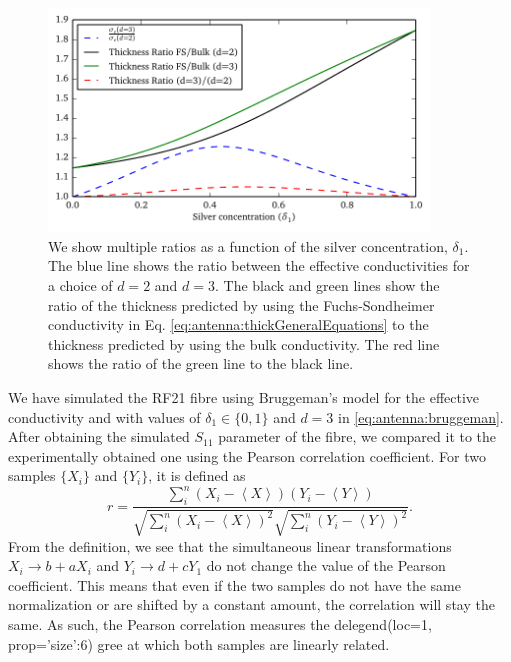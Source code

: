 \begin{figure}
  \centering
  \includegraphics[width=0.9\textwidth]{figs/active/comparisonThickness.pdf}
  \caption[Thickness ratios as a function of the silver concentration]
	  {We show multiple ratios as a function of the silver concentration,
	  $\delta_1$. The blue line shows the ratio between the effective
	  conductivities for a choice of $d=2$ and $d=3$. The black and 
	  green lines show the ratio of the thickness predicted by using
	  the Fuchs-Sondheimer conductivity in Eq. \eqref{eq:antenna:thickGeneralEquations}
	  to the thickness predicted by using the bulk conductivity.
	  The red line shows the ratio of the green line to the black line.}
  \label{fig:antenna.thicknessRatios}
\end{figure}

We have simulated the RF21 fibre using Bruggeman's model
for the effective conductivity and with values
of $\delta_1\in\{0,1\}$ and $d=3$ in \eqref{eq:antenna:bruggeman}.
After obtaining the simulated $S_\text{11}$ parameter of the fibre,
we compared it to the experimentally obtained one using the Pearson
correlation coefficient. For two samples $\{X_i\}$ and 
$\{Y_i\}$, it is defined as
  \begin{equation}
    r = \frac{\sum_i^n\left(X_i-\left\langle X\right\rangle\right)\left(Y_i-\left\langle Y\right\rangle\right)}
	     {\sqrt{\sum_i^n\left(X_i-\left\langle X\right\rangle\right)^2}\sqrt{\sum_i^n\left(Y_i-\left\langle Y\right\rangle\right)^2}}.
  \end{equation}
From the definition, we see that the simultaneous linear transformations $X_i\rightarrow b+aX_i$ and $Y_i\rightarrow d+cY_1$
do not change the value of the Pearson coefficient. This means that even if the two samples
do not have the same normalization or are shifted by a constant amount, the correlation 
will stay the same. As such, the Pearson correlation measures the delegend(loc=1, prop={'size':6})
gree at which 
both samples are linearly related. 

